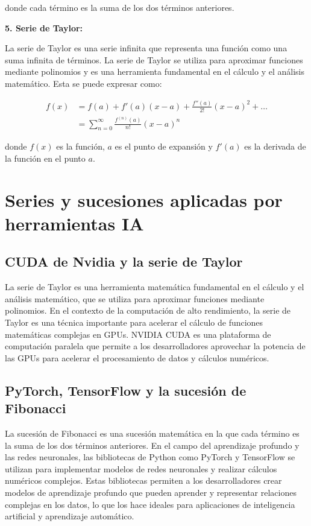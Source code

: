 \documentclass[11pt, a4paper]{article}
\begin{document}
\begin{multicols}{2}
    donde cada término es la suma de los dos términos anteriores.
    
    \begin{center}
      \textbf{5. Serie de Taylor:}
    \end{center}
    La serie de Taylor es una serie infinita que representa una función como una suma infinita de términos. La serie de Taylor se utiliza para aproximar funciones mediante polinomios y es una herramienta fundamental en el cálculo y el análisis matemático. Esta se puede expresar como:

    \begin{align*}
      f(x) & = f(a) + f'(a)(x - a) + \frac{f''(a)}{2!}(x - a)^2 + \dots \nonumber \\
      & = \sum_{n=0}^{\infty} \frac{f^{(n)}(a)}{n!}(x - a)^n
    \end{align*}

    donde \( f(x) \) es la función, \( a \) es el punto de expansión y \( f'(a) \) es la derivada de la función en el punto \( a \).

  \end{multicols}

  \newpage

  \section{Series y sucesiones aplicadas por herramientas IA}

  \subsection{CUDA de Nvidia y la serie de Taylor}

  La serie de Taylor es una herramienta matemática fundamental en el cálculo y el análisis matemático, que se utiliza para aproximar funciones mediante polinomios. En el contexto de la computación de alto rendimiento, la serie de Taylor es una técnica importante para acelerar el cálculo de funciones matemáticas complejas en GPUs. NVIDIA CUDA es una plataforma de computación paralela que permite a los desarrolladores aprovechar la potencia de las GPUs para acelerar el procesamiento de datos y cálculos numéricos.

  \subsection{PyTorch, TensorFlow y la sucesión de Fibonacci}

  La sucesión de Fibonacci es una sucesión matemática en la que cada término es la suma de los dos términos anteriores. En el campo del aprendizaje profundo y las redes neuronales, las bibliotecas de Python como PyTorch y TensorFlow se utilizan para implementar modelos de redes neuronales y realizar cálculos numéricos complejos. Estas bibliotecas permiten a los desarrolladores crear modelos de aprendizaje profundo que pueden aprender y representar relaciones complejas en los datos, lo que los hace ideales para aplicaciones de inteligencia artificial y aprendizaje automático.
\end{document}
